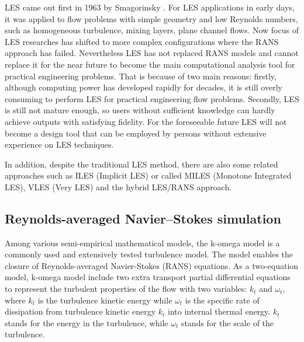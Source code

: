 LES came out first in 1963 by Smagorinsky \cite{Smagorinsky1963}. For LES applications in early days, it was applied to flow problems with simple geometry and low Reynolds numbers, such as homogeneous turbulence, mixing layers, plane channel flows. Now focus of LES researches has shifted to more complex configurations where the RANS approach has failed. Nevertheless LES has not replaced RANS models and cannot replace it for the near future to become the main computational analysis tool for practical engineering problems. That is because of two main reasons: firstly, although computing power has developed rapidly for decades, it is still overly consuming to perform LES for practical engineering flow problems. Secondly, LES is still not mature enough, so users without sufficient knowledge can hardly achieve outputs with satisfying fidelity. For the foreseeable future LES will not become a design tool that can be employed by persons without extensive experience on LES techniques. \cite{Zhiyin2015}

In addition, despite the traditional LES method, there are also some related approaches such as ILES (Implicit LES) or called MILES (Monotone Integrated LES), VLES (Very LES) and the hybrid LES/RANS approach.






\subsection{Reynolds-averaged Navier–Stokes simulation}



Among various semi-empirical mathematical models, the k-omega model is a commonly used and extensively tested turbulence model. The model enables the closure of Reynolds-averaged Navier-Stokes (RANS) equations. As a two-equation model, k-omega model include two extra transport partial differential equations to represent the turbulent properties of the flow with two variables: $ k_t $ and $ \omega_t $, where $ k_t $ is the turbulence kinetic energy while $ \omega_t $ is the specific rate of dissipation from turbulence kinetic energy $ k_t $ into internal thermal energy. $ k_t $ stands for the energy in the turbulence, while $ \omega_t $ stands for the scale of the turbulence. \cite{komegacfdwiki,komegawikip}

